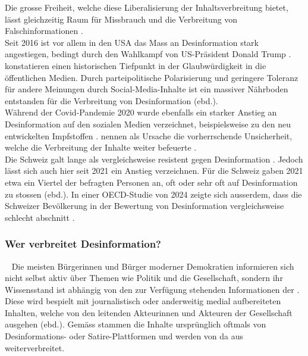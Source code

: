 \documentclass[12pt,a4paper]{article}        %
\begin{document}
Die grosse Freiheit, welche diese Liberalisierung der Inhaltsverbreitung bietet, lässt gleichzeitig Raum für Missbrauch und die Verbreitung von Falschinformationen \parencite[4]{ceron_fake_2021}.\\
Seit 2016 ist vor allem in den USA das Mass an Desinformation stark angestiegen, bedingt durch den Wahlkampf von US-Präsident Donald Trump \parencites[1094f]{lazer_science_2018}{allcott_social_2017}[147]{marx_fake_2020}[147]{tandoc_jr_defining_2018}. \textcite[1094f]{lazer_science_2018} konstatieren einen historischen Tiefpunkt in der Glaubwürdigkeit in die öffentlichen Medien. Durch parteipolitische Polarisierung und geringere Toleranz für andere Meinungen durch Social-Media-Inhalte ist ein massiver Nährboden entstanden für die Verbreitung von Desinformation (ebd.).\\
Während der Covid-Pandemie 2020 wurde ebenfalls ein starker Anstieg an Desinformation auf den sozialen Medien verzeichnet, beispielsweise zu den neu entwickelten Impfstoffen \parencite[2]{khan_fake_2021}. \Textcite[2]{ceron_fake_2021} nennen als Ursache die vorherrschende Unsicherheit, welche die Verbreitung der Inhalte weiter befeuerte \parencite[vgl.\ auch][22f]{zoglauer_konstruierte_2021}. \\

Die Schweiz galt lange als vergleichsweise resistent gegen Desinformation \parencite[26]{vogler_wahrnehmung_2021}. Jedoch lässt sich auch hier seit 2021 ein Anstieg verzeichnen. Für die Schweiz gaben 2021 etwa ein Viertel der befragten Personen an, oft oder sehr oft auf Desinformation zu stossen (ebd.). In einer OECD-Studie von 2024 zeigte sich ausserdem, dass die Schweizer Bevölkerung in der Bewertung von Desinformation vergleichsweise schlecht abschnitt \parencite{wyl_schweizerinnen_2024}.

\subsubsection{Wer verbreitet Desinformation?}
~\label{theory_disseminents}
Die meisten Bürgerinnen und Bürger moderner Demokratien informieren sich nicht selbst aktiv über Themen wie Politik und die Gesellschaft, sondern ihr Wissensstand ist abhängig von den zur Verfügung stehenden Informationen der  \parencite[69]{lecheler_disinformation_2022}. Diese wird bespielt mit journalistisch oder anderweitig medial aufbereiteten Inhalten, welche von den leitenden Akteurinnen und Akteuren der Gesellschaft ausgehen (ebd.). Gemäss \textcite[217]{allcott_social_2017} stammen die Inhalte ursprünglich oftmals von Desinformations- oder Satire-Plattformen und werden von da aus weiterverbreitet.
\end{document}
